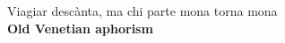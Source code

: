 \vspace*{\fill}
\begin{em}
	\noindent Viagiar desc\`{a}nta, ma chi parte mona torna mona \\
	\textbf{Old Venetian aphorism}
\end{em}	
\vspace*{\fill}